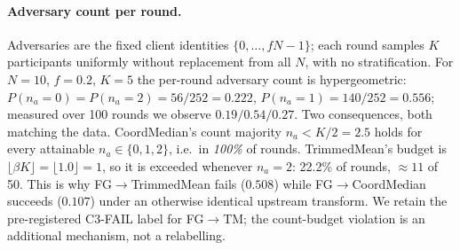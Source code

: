 \documentclass{article}
\begin{document}
\paragraph{Adversary count per round.} Adversaries are the fixed client identities $\{0,\dots,fN-1\}$; each round samples $K$ participants uniformly without replacement from all $N$, with no stratification. For $N{=}10$, $f{=}0.2$, $K{=}5$ the per-round adversary count is hypergeometric: $P(n_a{=}0) = P(n_a{=}2) = 56/252 = 0.222$, $P(n_a{=}1) = 140/252 = 0.556$; measured over 100 rounds we observe $0.19/0.54/0.27$. Two consequences, both matching the data. CoordMedian's count majority $n_a < K/2 = 2.5$ holds for every attainable $n_a \in \{0,1,2\}$, i.e.\ in \emph{100\%} of rounds. TrimmedMean's budget is $\lfloor\beta K\rfloor = \lfloor 1.0 \rfloor = 1$, so it is exceeded whenever $n_a{=}2$: 22.2\% of rounds, ${\approx}11$ of 50. This is why FG$\to$TrimmedMean fails ($0.508$) while FG$\to$CoordMedian succeeds ($0.107$) under an otherwise identical upstream transform. We retain the pre-registered C3-FAIL label for FG$\to$TM; the count-budget violation is an additional mechanism, not a relabelling.
\end{document}
